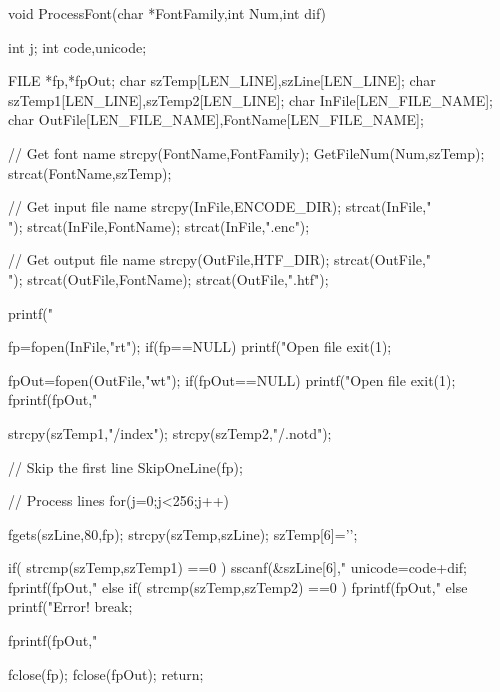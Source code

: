 void ProcessFont(char *FontFamily,int Num,int dif)
{
    int j;
    int code,unicode;

 FILE *fp,*fpOut;
 char szTemp[LEN_LINE],szLine[LEN_LINE];
 char szTemp1[LEN_LINE],szTemp2[LEN_LINE];
 char InFile[LEN_FILE_NAME];
 char OutFile[LEN_FILE_NAME],FontName[LEN_FILE_NAME];

//  Get font name
    strcpy(FontName,FontFamily);
    GetFileNum(Num,szTemp);
    strcat(FontName,szTemp);

//  Get input file name
    strcpy(InFile,ENCODE_DIR);
    strcat(InFile,"\\");
    strcat(InFile,FontName);
    strcat(InFile,".enc");

//  Get output file name
    strcpy(OutFile,HTF_DIR);
    strcat(OutFile,"\\");
    strcat(OutFile,FontName);
    strcat(OutFile,".htf");

    printf("%

    fp=fopen(InFile,"rt");
    if(fp==NULL)
      {
       printf("Open file %
       exit(1);
      }

    fpOut=fopen(OutFile,"wt");
    if(fpOut==NULL)
      {
       printf("Open file %
       exit(1);
      }
    fprintf(fpOut,"%

    strcpy(szTemp1,"/index");
    strcpy(szTemp2,"/.notd");

    // Skip the first line
    SkipOneLine(fp);

    // Process lines
    for(j=0;j<256;j++)
       {
        fgets(szLine,80,fp);
        strcpy(szTemp,szLine);
        szTemp[6]='\0';

        if( strcmp(szTemp,szTemp1) ==0 )
          {
           sscanf(&szLine[6],"%
           unicode=code+dif;
           fprintf(fpOut,"%
          }
        else if( strcmp(szTemp,szTemp2) ==0 )
          {
           fprintf(fpOut,"%
          }
        else
          {
           printf("Error! %
           break;
          }
       }
    fprintf(fpOut,"%

    fclose(fp);
    fclose(fpOut);
    return;
}


